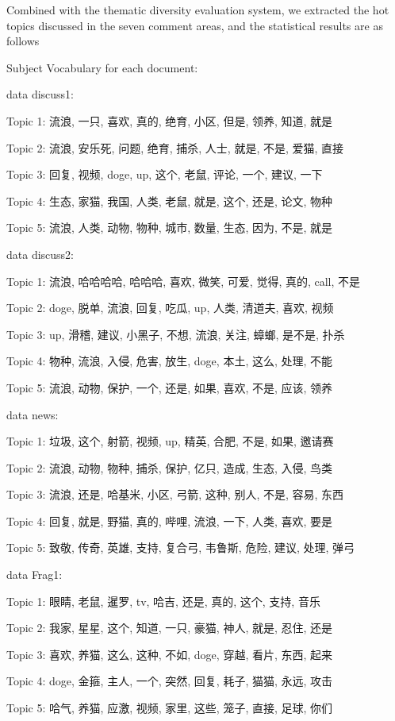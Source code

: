 \documentclass[12pt,a4paper]{ctexart}
\begin{document}
Combined with the thematic diversity evaluation system, we extracted the hot topics discussed in the seven comment areas, and the statistical results are as follows

Subject Vocabulary for each document:

data discuss1:

Topic 1: 流浪, 一只, 喜欢, 真的, 绝育, 小区, 但是, 领养, 知道, 就是

Topic 2: 流浪, 安乐死, 问题, 绝育, 捕杀, 人士, 就是, 不是, 爱猫, 直接

Topic 3: 回复, 视频, doge, up, 这个, 老鼠, 评论, 一个, 建议, 一下

Topic 4: 生态, 家猫, 我国, 人类, 老鼠, 就是, 这个, 还是, 论文, 物种

Topic 5: 流浪, 人类, 动物, 物种, 城市, 数量, 生态, 因为, 不是, 就是

data discuss2:

Topic 1: 流浪, 哈哈哈哈, 哈哈哈, 喜欢, 微笑, 可爱, 觉得, 真的, call, 不是

Topic 2: doge, 脱单, 流浪, 回复, 吃瓜, up, 人类, 清道夫, 喜欢, 视频

Topic 3: up, 滑稽, 建议, 小黑子, 不想, 流浪, 关注, 蟑螂, 是不是, 扑杀

Topic 4: 物种, 流浪, 入侵, 危害, 放生, doge, 本土, 这么, 处理, 不能

Topic 5: 流浪, 动物, 保护, 一个, 还是, 如果, 喜欢, 不是, 应该, 领养

data news:

Topic 1: 垃圾, 这个, 射箭, 视频, up, 精英, 合肥, 不是, 如果, 邀请赛

Topic 2: 流浪, 动物, 物种, 捕杀, 保护, 亿只, 造成, 生态, 入侵, 鸟类

Topic 3: 流浪, 还是, 哈基米, 小区, 弓箭, 这种, 别人, 不是, 容易, 东西

Topic 4: 回复, 就是, 野猫, 真的, 哔哩, 流浪, 一下, 人类, 喜欢, 要是

Topic 5: 致敬, 传奇, 英雄, 支持, 复合弓, 韦鲁斯, 危险, 建议, 处理, 弹弓

data Frag1:

Topic 1: 眼睛, 老鼠, 暹罗, tv, 哈吉, 还是, 真的, 这个, 支持, 音乐

Topic 2: 我家, 星星, 这个, 知道, 一只, 豪猫, 神人, 就是, 忍住, 还是

Topic 3: 喜欢, 养猫, 这么, 这种, 不如, doge, 穿越, 看片, 东西, 起来

Topic 4: doge, 金箍, 主人, 一个, 突然, 回复, 耗子, 猫猫, 永远, 攻击

Topic 5: 哈气, 养猫, 应激, 视频, 家里, 这些, 笼子, 直接, 足球, 你们
\end{document}
